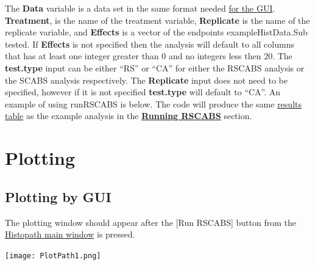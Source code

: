 \documentclass[a4paper]{article}
\begin{document}
The \textbf{Data} variable is a data set in the same format needed \hyperref[subsec:Data]{for the GUI}. \textbf{Treatment}, is the name of the treatment variable, 
\textbf{Replicate} is the name of the replicate variable, and \textbf{Effects} is a vector of the endpoints exampleHistData.Sub tested.  If \textbf{Effects}
is not specified then the analysis will default to all columns that has at least one integer greater than 0 and no integers less then 20. 
 The \textbf{test.type} input can be either ``RS'' or ``CA'' for either the RSCABS analysis or 
the SCABS analysis respectively. The \textbf{Replicate} input does not need to be specified, however if it is not specified 
\textbf{test.type} will default to ``CA''. An example of using runRSCABS is below.  
The code will produce the same \hyperlink{fig:Results}{results table} as the 
example analysis in the \hyperref[subsec:RunRSCABS]{\textbf{Running RSCABS}} section.    
 


\par




\section*{Plotting}
\label{sec:Plotting}
\thispagestyle{plain}

\subsection*{Plotting by GUI}
\label{subsec:PlottingWindow}

	The plotting window should appear after the [Run RSCABS] button from the \hyperref[fig:RunButton]{Histopath main window} is pressed.      	

\begin{center}
\texttt{[image: PlotPath1.png]}
\end{center} 
\par
	
\end{document}
